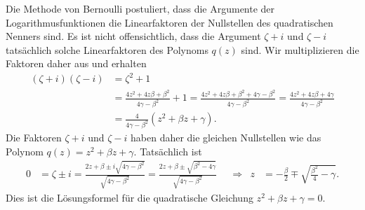 Die Methode von Bernoulli postuliert, dass die Argumente der
Logarithmusfunktionen die Linearfaktoren der Nullstellen des
quadratischen Nenners sind.
Es ist nicht offensichtlich, dass die Argument $\zeta+i$ und $\zeta-i$
tatsächlich solche Linearfaktoren des Polynoms $q(z)$ sind.
Wir multiplizieren die Faktoren daher aus und erhalten
\begin{align*}
(\zeta+i)(\zeta-i)
&=
\zeta^2+1
\\
&=
\frac{4z^2+4z\beta+\beta^2}{4\gamma-\beta^2}
+
1
=
\frac{4z^2+4z\beta+\beta^2+4\gamma-\beta^2}{4\gamma-\beta^2}
=
\frac{4z^2+4z\beta+4\gamma}{4\gamma-\beta^2}
\\
&=
\frac{4}{4\gamma-\beta^2}
(z^2+\beta z+\gamma).
\end{align*}
Die Faktoren $\zeta+i$ und $\zeta-i$ haben daher die gleichen
Nullstellen wie das Polynom $q(z)=z^2+\beta z+\gamma$.
Tatsächlich ist
\begin{align*}
0&=\zeta\pm i
=
\frac{2z+\beta\pm i\!\sqrt{4\gamma-\beta^2}}{\!\sqrt{4\gamma-\beta^2}}
=
\frac{2z+\beta\pm \!\sqrt{\beta^2 - 4\gamma}}{\!\sqrt{4\gamma-\beta^2}}
&&\Rightarrow&
z
&=
-\frac{\beta}2\mp \!\sqrt{\frac{\beta^2}{4}-\gamma}.
\end{align*}
Dies ist die Lösungsformel für die quadratische Gleichung
$z^2+\beta z+\gamma=0$.





